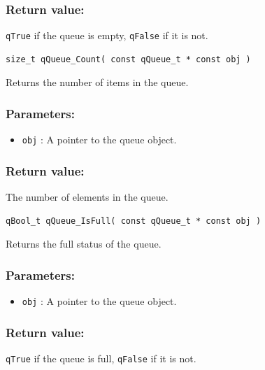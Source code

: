 \documentclass{article}
\begin{document}
\subsubsection*{Return value:}
\lstinline{qTrue} if the queue is empty, \lstinline{qFalse} if it is not.

\noindent\hrulefill


\begin{lstlisting}[style=CStyle]
size_t qQueue_Count( const qQueue_t * const obj )
\end{lstlisting}

Returns the number of items in the queue. 

\subsubsection*{Parameters:}
\begin{itemize}
    \item \lstinline{obj} : A pointer to the queue object.
\end{itemize}

\subsubsection*{Return value:}
The number of elements in the queue.

\noindent\hrulefill


\begin{lstlisting}[style=CStyle]
qBool_t qQueue_IsFull( const qQueue_t * const obj )
\end{lstlisting}

Returns the full status of the queue. 

\subsubsection*{Parameters:}
\begin{itemize}
    \item \lstinline{obj} : A pointer to the queue object.
\end{itemize}

\subsubsection*{Return value:}
\lstinline{qTrue} if the queue is full, \lstinline{qFalse} if it is not.

\noindent\hrulefill
\end{document}
